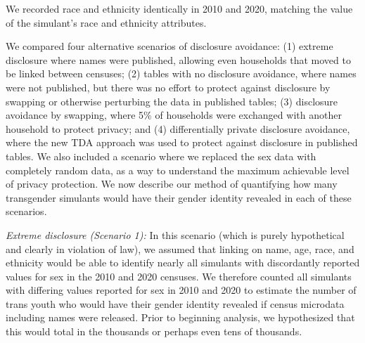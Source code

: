 \documentclass{jpc} %
\theoremstyle{plain}\newtheorem{satz}[thm]{Satz} %
\begin{document}
We recorded race and ethnicity identically in 2010 and 2020, matching the value of the simulant's race and ethnicity attributes.

We compared four alternative scenarios of disclosure avoidance: (1) extreme disclosure where names were published, allowing even households that moved to be linked between censuses; (2) tables with no disclosure avoidance, where names were not published, but there was no effort to protect against disclosure by swapping or otherwise perturbing the data in published tables; (3) disclosure avoidance by swapping, where 5\% of households were exchanged with another household to protect privacy; and (4) differentially private disclosure avoidance, where the new TDA approach was used to protect against disclosure in published tables.  We also included a scenario where we replaced the sex data with completely random data, as a way to understand the maximum achievable level of privacy protection.  We now describe our method of quantifying how many transgender simulants would have their gender identity revealed in each of these scenarios.

\emph{Extreme disclosure (Scenario 1):} In this scenario (which is purely hypothetical and clearly in violation of law), we assumed that linking on name, age, race, and ethnicity would be able to identify nearly all simulants with discordantly reported values for sex in the 2010 and 2020 censuses.  We therefore counted all simulants with differing values reported for sex in 2010 and 2020 to estimate the number of trans youth who would have their gender identity revealed if census microdata including names were released.  Prior to beginning analysis, we hypothesized that this would total in the thousands or perhaps even tens of thousands.
\end{document}
